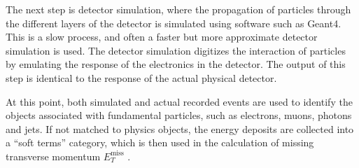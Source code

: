 \documentclass[12pt,a4paper,openright,twoside]{report}
\newcommand{\met}{$E_T^{\mathrm{miss}}$ }
\begin{document}
The next step is detector simulation, where the propagation of particles through the different layers of the detector is simulated using software such as Geant4\cite{geant4}. This is a slow process, and often a faster but more approximate detector simulation is used. The detector simulation digitizes the interaction of particles by emulating the response of the electronics in the detector. The output of this step is identical to the response of the actual physical detector.

At this point, both simulated and actual recorded events are used to identify the objects associated with fundamental particles, such as electrons, muons, photons and jets. If not matched to physics objects, the energy deposits are collected into a ``soft terms'' category, which is then used in the calculation of missing transverse momentum \met.
\end{document}
